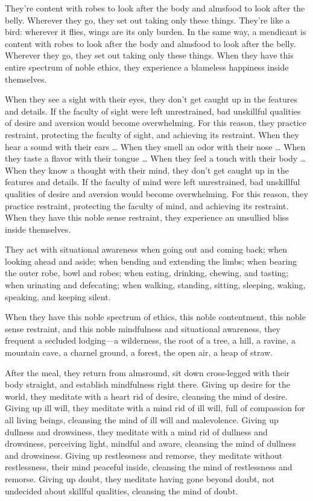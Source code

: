 \documentclass[12pt,openany]{book}%
\begin{document}
They’re content with robes to look after the body and almsfood to look after the belly. Wherever they go, they set out taking only these things. They’re like a bird: wherever it flies, wings are its only burden. In the same way, a mendicant is content with robes to look after the body and almsfood to look after the belly. Wherever they go, they set out taking only these things. When they have this entire spectrum of noble ethics, they experience a blameless happiness inside themselves. 

When they see a sight with their eyes, they don’t get caught up in the features and details. If the faculty of sight were left unrestrained, bad unskillful qualities of desire and aversion would become overwhelming. For this reason, they practice restraint, protecting the faculty of sight, and achieving its restraint. When they hear a sound with their ears … When they smell an odor with their nose … When they taste a flavor with their tongue … When they feel a touch with their body … When they know a thought with their mind, they don’t get caught up in the features and details. If the faculty of mind were left unrestrained, bad unskillful qualities of desire and aversion would become overwhelming. For this reason, they practice restraint, protecting the faculty of mind, and achieving its restraint. When they have this noble sense restraint, they experience an unsullied bliss inside themselves. 

They act with situational awareness when going out and coming back; when looking ahead and aside; when bending and extending the limbs; when bearing the outer robe, bowl and robes; when eating, drinking, chewing, and tasting; when urinating and defecating; when walking, standing, sitting, sleeping, waking, speaking, and keeping silent. 

When they have this noble spectrum of ethics, this noble contentment, this noble sense restraint, and this noble mindfulness and situational awareness, they frequent a secluded lodging—a wilderness, the root of a tree, a hill, a ravine, a mountain cave, a charnel ground, a forest, the open air, a heap of straw. 

After the meal, they return from almsround, sit down cross-legged with their body straight, and establish mindfulness right there. Giving up desire for the world, they meditate with a heart rid of desire, cleansing the mind of desire. Giving up ill will, they meditate with a mind rid of ill will, full of compassion for all living beings, cleansing the mind of ill will and malevolence. Giving up dullness and drowsiness, they meditate with a mind rid of dullness and drowsiness, perceiving light, mindful and aware, cleansing the mind of dullness and drowsiness. Giving up restlessness and remorse, they meditate without restlessness, their mind peaceful inside, cleansing the mind of restlessness and remorse. Giving up doubt, they meditate having gone beyond doubt, not undecided about skillful qualities, cleansing the mind of doubt. 
\end{document}
